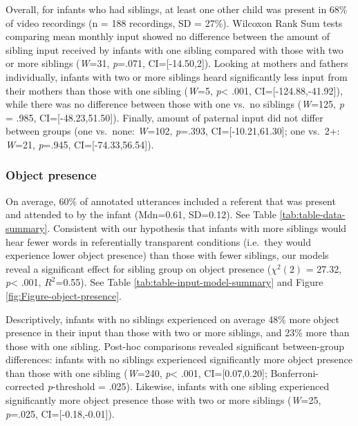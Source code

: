 \documentclass[
  man,mask,floatsintext]{apa6}
\begin{document}
Overall, for infants who had siblings, at least one other child was present in 68\% of video recordings (n = 188 recordings, SD = 27\%). Wilcoxon Rank Sum tests comparing mean monthly input showed no difference between the amount of sibling input received by infants with one sibling compared with those with two or more siblings (\emph{W}=31, \emph{p}=.071, CI={[}-14.50,2{]}). Looking at mothers and fathers individually, infants with two or more siblings heard significantly less input from their mothers than those with one sibling (\emph{W}=5, \emph{p}\textless{} .001, CI={[}-124.88,-41.92{]}), while there was no difference between those with one vs.~no siblings (\emph{W}=125, \emph{p} = .985, CI={[}-48.23,51.50{]}). Finally, amount of paternal input did not differ between groups (one vs.~none: \emph{W}=102, \emph{p}=.393, CI={[}-10.21,61.30{]}; one vs.~2+: \emph{W}=21, \emph{p}=.945, CI={[}-74.33,56.54{]}).

\hypertarget{object-presence}{%
\subsubsection{Object presence}\label{object-presence}}

On average, 60\% of annotated utterances included a referent that was present and attended to by the infant (Mdn=0.61, SD=0.12). See Table \ref{tab:table-data-summary}. Consistent with our hypothesis that infants with more siblings would hear fewer words in referentially transparent conditions (i.e.~they would experience lower object presence) than those with fewer siblings, our models reveal a significant effect for sibling group on object presence (\(\chi^2 (2)\) = 27.32, \emph{p}\textless{} .001, \(R^2\)=0.55). See Table \ref{tab:table-input-model-summary} and Figure \ref{fig:Figure-object-presence}.

Descriptively, infants with no siblings experienced on average 48\% more object presence in their input than those with two or more siblings, and 23\% more than those with one sibling. Post-hoc comparisons revealed significant between-group differences: infants with no siblings experienced significantly more object presence than those with one sibling (\emph{W}=240, \emph{p}\textless{} .001, CI={[}0.07,0.20{]}; Bonferroni-corrected \emph{p}-threshold = .025). Likewise, infants with one sibling experienced significantly more object presence those with two or more siblings (\emph{W}=25, \emph{p}=.025, CI={[}-0.18,-0.01{]}).
\end{document}
